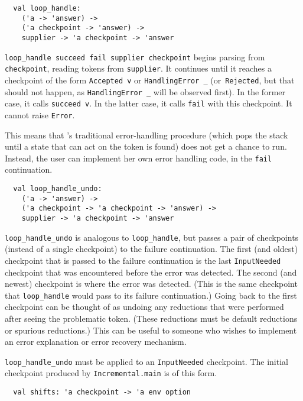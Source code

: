 \documentclass[onecolumn,11pt,nocopyrightspace,preprint]{sigplanconf}
\begin{document}
\begin{verbatim}
  val loop_handle:
    ('a -> 'answer) ->
    ('a checkpoint -> 'answer) ->
    supplier -> 'a checkpoint -> 'answer
\end{verbatim}

\verb+loop_handle succeed fail supplier checkpoint+ begins parsing from
\verb+checkpoint+, reading tokens from \verb+supplier+. It continues until
it reaches a checkpoint of the form \verb+Accepted v+ or \verb+HandlingError _+
(or~\verb+Rejected+, but that should not happen, as \verb+HandlingError _+
will be observed first). In the former case, it calls \verb+succeed v+. In
the latter case, it calls \verb+fail+ with this checkpoint. It cannot
raise \verb+Error+.

This means that \menhir's traditional error-handling procedure (which pops the
stack until a state that can act on the \error token is found) does not get a
chance to run. Instead, the user can implement her own error handling code, in
the \verb+fail+ continuation.


\begin{verbatim}
  val loop_handle_undo:
    ('a -> 'answer) ->
    ('a checkpoint -> 'a checkpoint -> 'answer) ->
    supplier -> 'a checkpoint -> 'answer
\end{verbatim}

\verb+loop_handle_undo+ is analogous to \verb+loop_handle+, but passes a pair
of checkpoints (instead of a single checkpoint) to the failure continuation.
%
The first (and oldest) checkpoint that is passed to the failure continuation
is the last \verb+InputNeeded+ checkpoint that was encountered before the
error was detected. The second (and newest) checkpoint is where the error was
detected. (This is the same checkpoint that \verb+loop_handle+ would pass to
its failure continuation.) Going back to the first checkpoint can be thought
of as undoing any reductions that were performed after seeing the problematic
token. (These reductions must be default reductions or spurious reductions.)
This can be useful to someone who wishes to implement an error explanation or
error recovery mechanism.

\verb+loop_handle_undo+ must be applied to an \verb+InputNeeded+ checkpoint.
The initial checkpoint produced by \verb+Incremental.main+ is of this form.


\begin{verbatim}
  val shifts: 'a checkpoint -> 'a env option
\end{verbatim}
\end{document}
